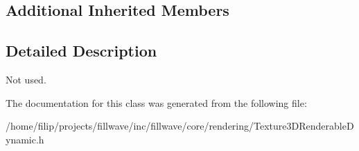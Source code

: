 \subsection*{Additional Inherited Members}


\subsection{Detailed Description}
Not used. 

The documentation for this class was generated from the following file\+:\begin{DoxyCompactItemize}
\item 
/home/filip/projects/fillwave/inc/fillwave/core/rendering/Texture3\+D\+Renderable\+Dynamic.\+h\end{DoxyCompactItemize}
